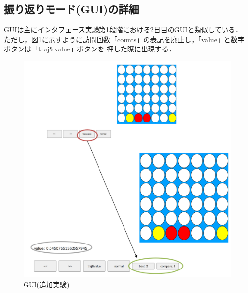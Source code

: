 \subsection{振り返りモード(GUI)の詳細}
GUIは主にインタフェース実験第1段階における2日目のGUIと類似している．
ただし，図\ref{fig:extra}に示すように訪問回数「counts」の表記を廃止し，「value」と数字ボタンは「traj\&value」ボタンを
押した際に出現する．
\begin{figure}[t]
	\centering
    \includegraphics[width=\linewidth]{./figure/extra.png}
	\caption{GUI(追加実験)}
	\label{fig:extra}
\end{figure}

